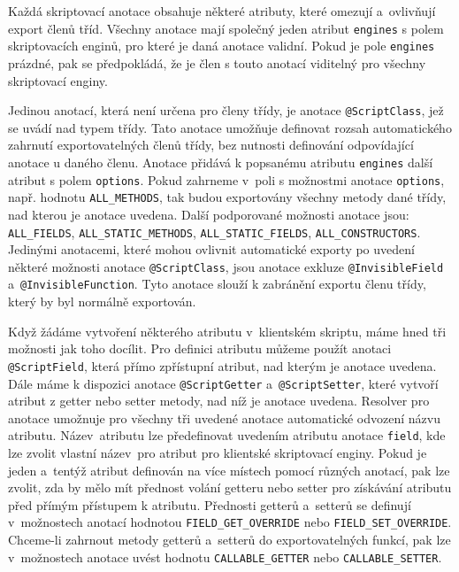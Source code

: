 \vspace{-1em}

Každá skriptovací anotace obsahuje některé atributy, které omezují a~ovlivňují export členů tříd. Všechny anotace mají společný jeden atribut \texttt{engines} s polem skriptovacích enginů, pro které je daná anotace validní. Pokud je pole \texttt{engines} prázdné, pak se předpokládá, že je člen s touto anotací viditelný pro všechny skriptovací enginy. 

Jedinou anotací, která není určena pro členy třídy, je anotace \texttt{@ScriptClass}, jež se uvádí nad typem třídy. Tato anotace umožňuje definovat rozsah automatického zahrnutí exportovatelných členů třídy, bez nutnosti definování odpovídající anotace u daného členu. Anotace přidává k popsanému atributu \texttt{engines} další atribut s polem \texttt{options}. Pokud zahrneme v~poli s možnostmi anotace \texttt{options}, např. hodnotu \texttt{ALL\_METHODS}, tak budou exportovány všechny metody dané třídy, nad kterou je anotace uvedena. Další podporované možnosti anotace jsou: \texttt{ALL\_FIELDS}, \texttt{ALL\_STATIC\_METHODS}, \texttt{ALL\_STATIC\_FIELDS}, \texttt{ALL\_CONSTRUCTORS}. Jedinými anotacemi, které mohou ovlivnit automatické exporty po uvedení některé možnosti anotace \texttt{@ScriptClass}, jsou anotace exkluze \texttt{@InvisibleField} a~\texttt{@InvisibleFunction}. Tyto anotace slouží k zabránění exportu členu třídy, který by byl normálně exportován. 

Když žádáme vytvoření některého atributu v~klientském skriptu, máme hned tři možnosti jak toho docílit. Pro definici atributu můžeme použít anotaci \texttt{@ScriptField}, která přímo zpřístupní atribut, nad kterým je anotace uvedena. Dále máme k dispozici anotace \texttt{@ScriptGetter} a~\texttt{@ScriptSetter}, které vytvoří atribut z getter nebo setter metody, nad níž je anotace uvedena. Resolver pro anotace umožnuje pro všechny tři uvedené anotace automatické odvození názvu atributu. Název~atributu lze předefinovat uvedením atributu anotace \texttt{field}, kde lze zvolit vlastní název~pro atribut pro klientské skriptovací enginy. Pokud je jeden a~tentýž atribut definován na více místech pomocí různých anotací, pak lze zvolit, zda by mělo mít přednost volání getteru nebo setter pro získávání atributu před přímým přístupem k atributu. Přednosti getterů a~setterů se definují v~možnostech anotací hodnotou \texttt{FIELD\_GET\_OVERRIDE} nebo \texttt{FIELD\_SET\_OVERRIDE}. Chceme-li zahrnout metody getterů a~setterů do exportovatelných funkcí, pak lze v~možnostech anotace uvést hodnotu \texttt{CALLABLE\_GETTER} nebo \texttt{CALLABLE\_SETTER}.

